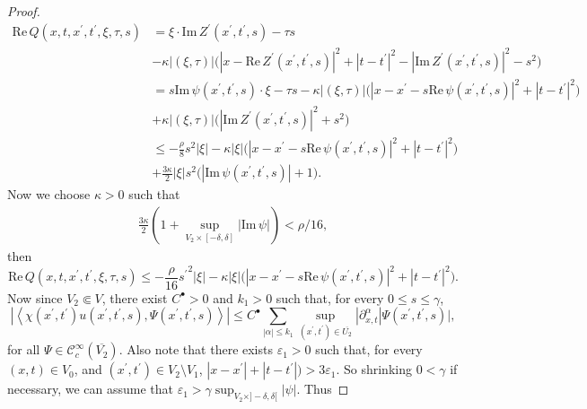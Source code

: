\documentclass[11pt]{amsart}
\renewcommand{\epsilon}{\varepsilon}
\renewcommand{\Re}{\mathrm{Re}\,}
\renewcommand{\Im}{\mathrm{Im}\,}
\theoremstyle{definition}
\theoremstyle{remark}
\theoremstyle{plain}
\begin{document}
\begin{proof}
%
\begin{align*}
	\Re Q(x,t, x^\prime, t^\prime, \xi, \tau, s) & = \xi \cdot \Im Z^\prime(x^\prime, t^\prime, s) - \tau s \\
	& - \kappa|(\xi,\tau)|\Big(|x - \Re Z^\prime(x^\prime, t^\prime,s)|^2 + |t - t^\prime|^2 - |\Im Z^\prime(x^\prime, t^\prime, s)|^2 - s^2\Big) \\
	& = s \Im \psi(x^\prime, t^\prime, s) \cdot \xi - \tau s - \kappa|(\xi, \tau)|\Big( |x - x^\prime - s \Re \psi(x^\prime, t^\prime, s)|^2 + |t - t^\prime|^2 \Big) \\
	& + \kappa|(\xi,\tau)|\Big(|\Im Z^\prime(x^\prime, t^\prime, s)|^2 + s^2\Big) \\
	& \leq - \frac{\rho}{8}{s}^2 |\xi|  - \kappa|\xi|\Big( |x - x^\prime - s \Re \psi(x^\prime, t^\prime, s)|^2 + |t - t^\prime|^2 \Big) \\ 
	& + \frac{3 \kappa}{2}|\xi| s^2 \Big(|\Im \psi(x^\prime, t^\prime, s)| + 1 \Big).
\end{align*}
%
Now we choose $\kappa > 0$ such that
%
\begin{align*}
	\frac{3\kappa}{2} \left(1 + \sup_{V_2 \times [-\delta, \delta]}|\Im \psi| \right)  < \rho / 16,
\end{align*}
%
then 
%
\begin{equation}\label{eq:bound_real_Q_commutaror_lenght_2}
	\Re Q(x,t, x^\prime, t^\prime, \xi, \tau, s)  \leq - \frac{\rho}{16}{s^\prime}^2 |\xi|  - \kappa|\xi|\Big( |x - x^\prime - s \Re \psi(x^\prime, t^\prime, s)|^2 + |t - t^\prime|^2 \Big) . 
\end{equation}
%
Now since $V_2 \Subset V$, there exist $C^\bullet > 0$ and $k_1>0$ such that, for every $0\leq s\leq \gamma$,
%
\begin{equation}\label{eq:distribuional_bound_u}
	\left|\left\langle \chi(x^\prime,t^\prime) u(x^\prime, t^\prime, s), \Psi(x^\prime, t^\prime, s) \right\rangle\right| \leq C^\bullet \sum_{|\alpha|\leq k_1} \sup_{(x^\prime,t^\prime) \in \overline{U_2}}|\partial_{x,t}^\alpha|\Psi(x^\prime, t^\prime, s)|,
\end{equation}
%
for all $\Psi\in \mathcal{C}^\infty_c(\overline{V_2})$. Also note that there exists $\epsilon_1 > 0$ such that, for every $(x,t) \in V_0$, and $(x^\prime, t^\prime) \in V_2\setminus V_1$,  $|x-x^\prime| + |t-t^\prime|) > 3\epsilon_1$. So shrinking $0 < \gamma$ if necessary, we can assume that $\epsilon_1 > \gamma\sup_{V_2\times]-\delta,\delta[}|\psi|$. Thus

\end{proof}
\end{document}
